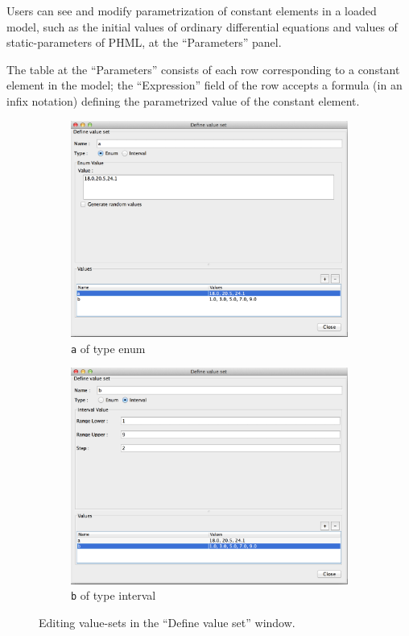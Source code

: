 \documentclass[a4paper,10pt]{report}
\begin{document}
Users can see and modify parametrization of constant elements in a loaded model,
such as the initial values of ordinary differential equations and values of
static-parameters of PHML, at the ``Parameters'' panel.

The table at the ``Parameters'' consists of each row corresponding to a constant
element in the model; the ``Expression'' field of the row accepts a formula
(in an infix notation) defining the parametrized value of the constant element.

\begin{figure}[h]
  \centering
  \begin{subfigure}[b]{0.45\textwidth}
    \includegraphics[width=\textwidth]{lr-value-set-a}
    \caption{{\tt a} of type enum}\label{fig:lr-value-set-a}
  \end{subfigure}
  \begin{subfigure}[b]{0.45\textwidth}
    \includegraphics[width=\textwidth]{lr-value-set-b}
    \caption{{\tt b} of type interval}\label{fig:lr-value-set-b}
  \end{subfigure}
  \caption{Editing value-sets in the ``Define value set'' window.}\label{fig:lr-value-set}
\end{figure}
\end{document}
